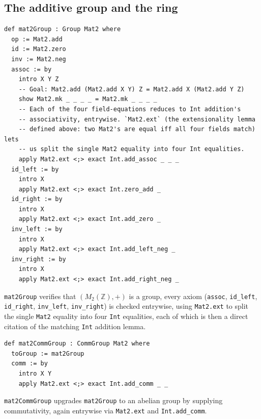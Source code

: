\subsection{The additive group and the ring}\label{sec:09-rings:07-matrices:3}

\begin{lstlisting}
def mat2Group : Group Mat2 where
  op := Mat2.add
  id := Mat2.zero
  inv := Mat2.neg
  assoc := by
    intro X Y Z
    -- Goal: Mat2.add (Mat2.add X Y) Z = Mat2.add X (Mat2.add Y Z)
    show Mat2.mk _ _ _ _ = Mat2.mk _ _ _ _
    -- Each of the four field-equations reduces to Int addition's
    -- associativity, entrywise. `Mat2.ext` (the extensionality lemma
    -- defined above: two Mat2's are equal iff all four fields match) lets
    -- us split the single Mat2 equality into four Int equalities.
    apply Mat2.ext <;> exact Int.add_assoc _ _ _
  id_left := by
    intro X
    apply Mat2.ext <;> exact Int.zero_add _
  id_right := by
    intro X
    apply Mat2.ext <;> exact Int.add_zero _
  inv_left := by
    intro X
    apply Mat2.ext <;> exact Int.add_left_neg _
  inv_right := by
    intro X
    apply Mat2.ext <;> exact Int.add_right_neg _
\end{lstlisting}

\texttt{mat2Group} verifies that \((M_2(\mathbb{Z}), +)\) is a group, every axiom (\texttt{assoc}, \texttt{id\_\allowbreak{}left}, \texttt{id\_\allowbreak{}right}, \texttt{inv\_\allowbreak{}left}, \texttt{inv\_\allowbreak{}right}) is checked entrywise, using \texttt{Mat2.ext} to split the single \texttt{Mat2} equality into four \texttt{Int} equalities, each of which is then a direct citation of the matching \texttt{Int} addition lemma.

\begin{lstlisting}
def mat2CommGroup : CommGroup Mat2 where
  toGroup := mat2Group
  comm := by
    intro X Y
    apply Mat2.ext <;> exact Int.add_comm _ _
\end{lstlisting}

\texttt{mat2CommGroup} upgrades \texttt{mat2Group} to an abelian group by supplying commutativity, again entrywise via \texttt{Mat2.ext} and \texttt{Int.add\_\allowbreak{}comm}.

